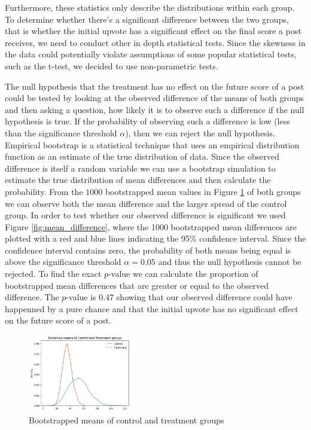\documentclass[fleqn,12pt]{article}
\begin{document}
Furthermore, these statistics only describe the distributions 
within each group. To determine whether there's a significant 
difference between the two groups, that is whether the 
initial upvote has a significant effect on the final score a post 
receives, we need to conduct other in depth statistical tests.
Since the skewness in the data could potentially violate assumptions
of some popular statistical tests, such as the t-test, we decided to use
non-parametric tests.

The null hypothesis
that the treatment has no effect on the future score of a post
could be tested by looking at the observed difference of the means of both groups
and then asking a question, how likely it is to observe such a difference
if the null hypothesis is true. If the probability of observing such a difference
is low (less than the significance threshold $\alpha$), then we can reject the null hypothesis.
Empirical bootstrap is a statistical technique that uses an empirical distribution 
function as an estimate of the true distribution of data. Since
the observed difference is itself a random variable we can use a bootstrap simulation
to estimate the true distribution of mean differences and then calculate the probability.
From the $1000$ bootstrapped mean values in Figure \ref{fig:bootstrap_both_means} of both groups we can observe both the mean difference
and the larger spread of the control group. In order to test
whether our observed difference is significant we used Figure \ref{fig:mean_difference},
where the 1000 bootstrapped mean differences are plotted with a red and blue lines
indicating the 95\% confidence interval. Since the confidence interval contains zero, the
probability of both means being equal is above the significance threshold $\alpha = 0.05$ and 
thus the null hypothesis cannot be rejected. 
To find the exact $p$-value we can calculate
the proportion of bootstrapped mean differences that are greater or equal to the observed difference.
The $p$-value is $0.47$ showing that our observed difference could have happenned by a pure chance
and that the initial upvote has no significant effect on the future score of a post.

\begin{figure}[h]
  \centering
  \includegraphics[width=0.4\textwidth]{figures/both_means.png}
  \caption{Bootstrapped means of control and treatment groups}
  \label{fig:bootstrap_both_means}
\end{figure}
\end{document}
